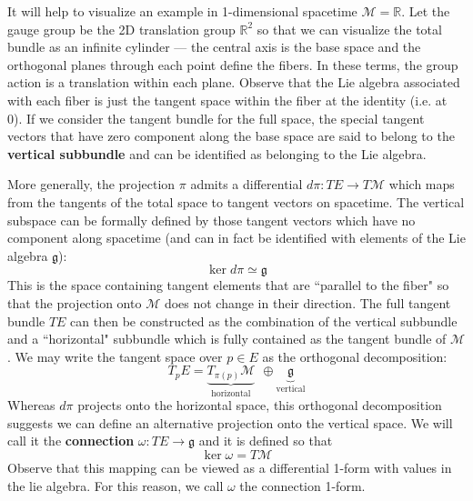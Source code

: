 \documentclass[onecolumn]{gwclass}
\renewcommand{\t}[1]{\text{#1}}
\newcommand{\man}{\mathcal{M}}
\newcommand{\R}{\mathbb{R}}
\begin{document}
It will help to visualize an example in 1-dimensional spacetime $\man=\R$. Let the gauge group be the 2D translation group $\R^2$ so that we can visualize the total bundle as an infinite cylinder --- the central axis is the base space and the orthogonal planes through each point define the fibers. In these terms, the group action is a translation within each plane. Observe that the Lie algebra associated with each fiber is just the tangent space within the fiber at the identity (i.e. at 0). If we consider the tangent bundle for the full space, the special tangent vectors that have zero component along the base space are said to belong to the \textbf{vertical subbundle} and can be identified as belonging to the Lie algebra.

More generally, the projection $\pi$ admits a differential $d\pi :TE\to T\mathcal{M}$ which maps from the tangents of the total space to tangent vectors on spacetime. The vertical subspace can be formally defined by those tangent vectors which have no component along spacetime (and can in fact be identified with elements of the Lie algebra $\mathfrak{g}$):
$$ \ker d\pi \simeq \mathfrak{g}$$
This is the space containing tangent elements that are ``parallel to the fiber" so that the projection onto $\mathcal{M}$ does not change in their direction. The full tangent bundle $TE$ can then be constructed as the combination of the vertical subbundle and a ``horizontal" subbundle which is fully contained as the tangent bundle of $\man$. We may write the tangent space over $p\in E$ as the orthogonal decomposition:
$$ T_pE = \underbrace{T_{\pi(p)}\man}_{\t{horizontal}}\:\:\oplus\underbrace{ \mathfrak{g}}_{\t{vertical}} $$
Whereas $d\pi$ projects onto the horizontal space, this orthogonal decomposition suggests we can define an alternative projection onto the vertical space. We will call it the \textbf{connection} $\omega:TE\to \mathfrak{g}$ and it is defined so that
$$ \ker\omega = T\man $$
Observe that this mapping can be viewed as a differential 1-form with values in the lie algebra. For this reason, we call $\omega$ the connection 1-form. 
\end{document}
